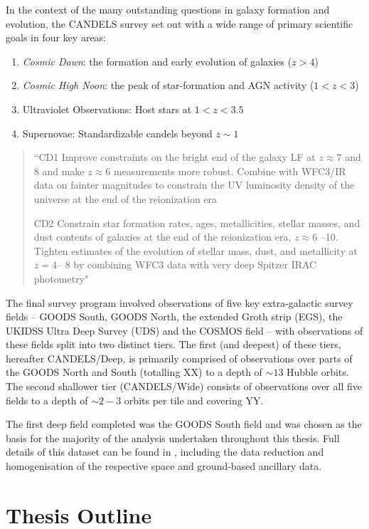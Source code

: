 In the context of the many outstanding questions in galaxy formation and evolution, the CANDELS survey set out with a wide range of primary scientific goals in four key areas:

\begin{enumerate}
		\item \emph{Cosmic Dawn}: the formation and early evolution of galaxies ($z > 4$)
		\item \emph{Cosmic High Noon}: the peak of star-formation and AGN activity ($1 < z < 3$)
		\item Ultraviolet Observations: Host stars at $1 < z < 3.5$
		\item Supernovae: Standardizable candels beyond $z\sim1$
\end{enumerate}

\begin{quotation}
	``CD1	\quad Improve constraints on the bright end of the galaxy LF at $z \approx 7$ and 8 and make $z \approx 6$ measurements more robust.
Combine with WFC3/IR data on fainter magnitudes to constrain the UV luminosity density of the universe at the end of the reionization era
	
	CD2 \quad Constrain star formation rates, ages, metallicities, stellar masses, and dust contents of galaxies at the end of the
reionization era, $z \approx 6$ --10. Tighten estimates of the evolution of stellar mass, dust, and metallicity at $z = 4$-- 8 by combining WFC3 data with very deep Spitzer IRAC photometry"
\end{quotation}

The final survey program involved observations of five key extra-galactic survey fields -- GOODS South, GOODS North, the extended Groth strip (EGS), the UKIDSS Ultra Deep Survey (UDS) and the COSMOS field -- with observations of these fields split into two distinct tiers. The first (and deepest) of these tiers, hereafter CANDELS/Deep, is primarily comprised of observations over parts of the GOODS North and South (totalling XX) to a depth of $\sim 13$ Hubble orbits. The second shallower tier (CANDELS/Wide) consists of observations over all five fields to a depth of $\sim 2-3$ orbits per tile and covering YY.

The first deep field completed was the GOODS South field and was chosen as the basis for the majority of the analysis undertaken throughout this thesis. Full details of this dataset can be found in \citet{Guo:2013ig}, including the data reduction and homogenisation of the respective space and ground-based ancillary data. 

\section{Thesis Outline}

